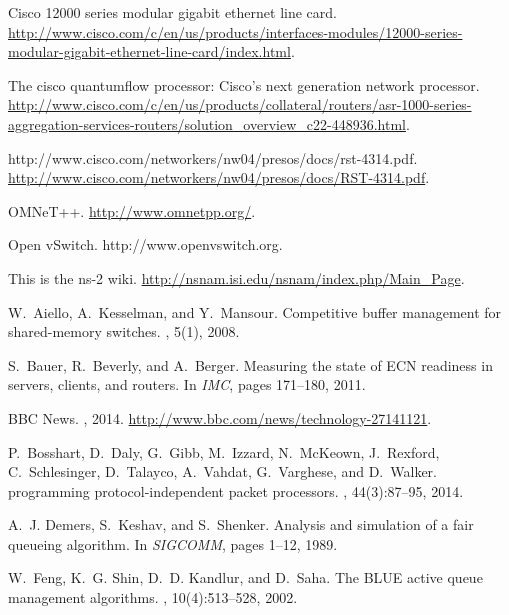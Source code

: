 \documentclass{article}
\begin{document}
\begin{thebibliography}{10}

Cisco 12000 series modular gigabit ethernet line card.
\newblock
  \url{http://www.cisco.com/c/en/us/products/interfaces-modules/12000-series-modular-gigabit-ethernet-line-card/index.html}.

The cisco quantumflow processor: Cisco's next generation network processor.
\newblock
  \url{http://www.cisco.com/c/en/us/products/collateral/routers/asr-1000-series-aggregation-services-routers/solution_overview_c22-448936.html}.

http://www.cisco.com/networkers/nw04/presos/docs/rst-4314.pdf.
\newblock \url{http://www.cisco.com/networkers/nw04/presos/docs/RST-4314.pdf}.

{OMNeT}++.
\newblock \url{http://www.omnetpp.org/}.

Open {vSwitch}.
\newblock http://www.openvswitch.org.

This is the {ns}-2 wiki.
\newblock \url{http://nsnam.isi.edu/nsnam/index.php/Main_Page}.

W.~Aiello, A.~Kesselman, and Y.~Mansour.
\newblock Competitive buffer management for shared-memory switches.
, 5(1), 2008.

S.~Bauer, R.~Beverly, and A.~Berger.
\newblock Measuring the state of {ECN} readiness in servers, clients, and
  routers.
\newblock In {\em {IMC}}, pages 171--180, 2011.

{BBC News}.
, 2014.
\newblock \url{http://www.bbc.com/news/technology-27141121}.

P.~Bosshart, D.~Daly, G.~Gibb, M.~Izzard, N.~McKeown, J.~Rexford,
  C.~Schlesinger, D.~Talayco, A.~Vahdat, G.~Varghese, and D.~Walker.
 programming protocol-independent packet processors.
, 44(3):87--95, 2014.

A.~J. Demers, S.~Keshav, and S.~Shenker.
\newblock Analysis and simulation of a fair queueing algorithm.
\newblock In {\em {SIGCOMM}}, pages 1--12, 1989.

W.~Feng, K.~G. Shin, D.~D. Kandlur, and D.~Saha.
\newblock The {BLUE} active queue management algorithms.
, 10(4):513--528, 2002.


\end{thebibliography}
\end{document}
